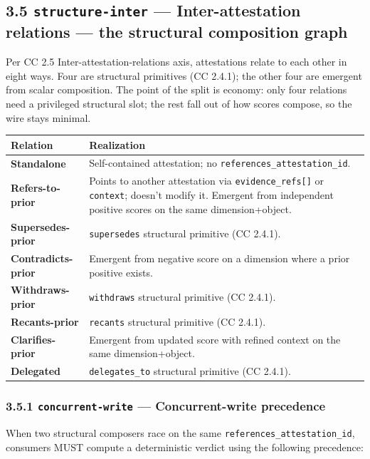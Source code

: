 \documentclass[11pt]{article}
\begin{document}
\subsection*{3.5 \texttt{structure-inter} — Inter-attestation relations — the structural composition graph}


Per CC 2.5 Inter-attestation-relations axis, attestations relate to each other in eight ways. Four are structural primitives (CC 2.4.1); the other four are emergent from scalar composition. The point of the split is economy: only four relations need a privileged structural slot; the rest fall out of how scores compose, so the wire stays minimal.


{\footnotesize
\begin{longtable}{|p{8.0cm}|p{8.0cm}|}\hline
\textbf{Relation} & \textbf{Realization} \\ \hline\endhead
\textbf{Standalone} & Self-contained attestation; no \texttt{references\_attestation\_id}. \\ \hline
\textbf{Refers-to-prior} & Points to another attestation via \texttt{evidence\_refs[]} or \texttt{context}; doesn't modify it. Emergent from independent positive scores on the same dimension+object. \\ \hline
\textbf{Supersedes-prior} & \texttt{supersedes} structural primitive (CC 2.4.1). \\ \hline
\textbf{Contradicts-prior} & Emergent from negative score on a dimension where a prior positive exists. \\ \hline
\textbf{Withdraws-prior} & \texttt{withdraws} structural primitive (CC 2.4.1). \\ \hline
\textbf{Recants-prior} & \texttt{recants} structural primitive (CC 2.4.1). \\ \hline
\textbf{Clarifies-prior} & Emergent from updated score with refined context on the same dimension+object. \\ \hline
\textbf{Delegated} & \texttt{delegates\_to} structural primitive (CC 2.4.1). \\ \hline
\end{longtable}}


\subsubsection*{3.5.1 \texttt{concurrent-write} — Concurrent-write precedence}


When two structural composers race on the same \texttt{references\_attestation\_id}, consumers MUST compute a deterministic verdict using the following precedence:
\end{document}
